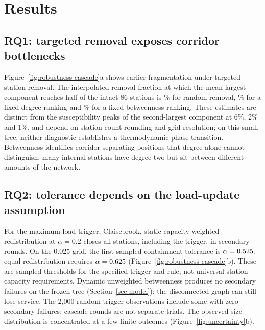 
\section{Results}
\label{sec:results}

\subsection{RQ1: targeted removal exposes corridor bottlenecks}
Figure~\ref{fig:robustness-cascade}a shows earlier fragmentation under targeted
station removal. The interpolated removal fraction at which the mean largest
component reaches half of the intact 86 stations is
\RandomCrossPercent\% for random removal, \DegreeCrossPercent\% for a fixed
degree ranking and \BetweenCrossPercent\% for a fixed betweenness ranking.
These estimates are distinct from the susceptibility peaks of the
second-largest component at 6\%, 2\% and 1\%, and depend on station-count
rounding and grid resolution; on this small tree, neither diagnostic
establishes a thermodynamic phase transition. Betweenness identifies
corridor-separating positions that degree alone cannot distinguish: many
internal stations have degree two but sit between different amounts of the
network.

\subsection{RQ2: tolerance depends on the load-update assumption}
For the maximum-load trigger, Claisebrook, static capacity-weighted
redistribution at $\alpha=0.2$ closes all \MaxLoadFailed{} stations, including
the trigger, in \MaxLoadRounds{} secondary rounds. On the 0.025 grid, the first
sampled containment tolerance is $\alpha=0.525$;
equal redistribution requires $\alpha=0.625$
(Figure~\ref{fig:robustness-cascade}b). These are sampled thresholds for the
specified trigger and rule, not universal station-capacity requirements.
Dynamic unweighted betweenness produces no secondary failures on the frozen
tree (Section~\ref{sec:model}): the disconnected graph can still lose service.
The 2,000 random-trigger observations include some with zero secondary
failures; cascade rounds are not separate trials. The observed size
distribution is concentrated at a few finite outcomes
(Figure~\ref{fig:uncertainty}b).

